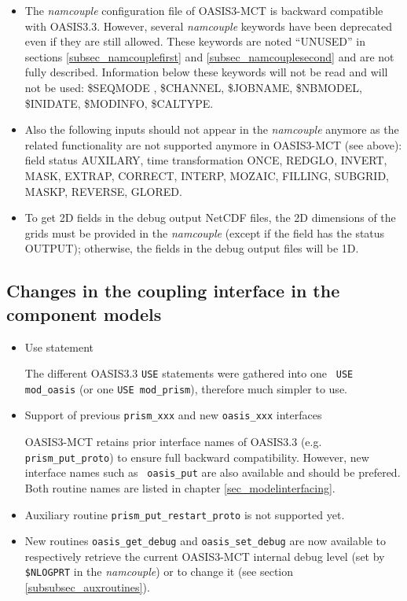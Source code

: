 \begin{itemize}

\item The {\it namcouple} configuration file of OASIS3-MCT is backward
compatible with OASIS3.3. However, several {\it namcouple} keywords
have been deprecated even if they are still 
allowed.  These keywords are noted ``UNUSED'' in sections
\ref{subsec_namcouplefirst} and \ref{subsec_namcouplesecond} and are
not fully described. Information below these keywords will not be read
and will not be used: \$SEQMODE , \$CHANNEL, \$JOBNAME, \$NBMODEL, \$INIDATE,
\$MODINFO, \$CALTYPE.

\item Also the following inputs should not appear in the {\it namcouple}
anymore as the related functionality are not supported anymore in
OASIS3-MCT (see above): field status AUXILARY, time transformation
ONCE, REDGLO, INVERT, MASK, EXTRAP, CORRECT, INTERP, MOZAIC, FILLING,
SUBGRID, MASKP, REVERSE, GLORED. 

\item To get 2D fields in the debug output NetCDF files, the 2D dimensions of the
  grids must be provided in the {\it namcouple} (except if the field
  has the status OUTPUT); otherwise, the fields in the debug output files will be 1D.

\end{itemize}

\subsection{Changes in the coupling interface in the component models}
\label{sec_changes_API}

\begin{itemize}

\item Use statement

The different OASIS3.3 {\tt USE} statements were gathered into one {\tt
  USE mod\_oasis} (or one {\tt USE mod\_prism}), therefore much
  simpler to use.

\item Support of previous {\tt prism\_xxx} and new {\tt oasis\_xxx}
  interfaces

OASIS3-MCT retains prior interface names of OASIS3.3
  (e.g. {\tt prism\_put\_proto}) to ensure full backward
  compatibility. However, new interface names such as {\tt
    oasis\_put} are also available and should be prefered. Both
  routine names are listed in chapter \ref{sec_modelinterfacing}.

\item Auxiliary routine {\tt  prism\_put\_restart\_proto} is not
  supported yet.

\item  New routines {\tt oasis\_get\_debug} and {\tt oasis\_set\_debug}
  are now available to respectively retrieve the current OASIS3-MCT
  internal debug level (set by {\tt \$NLOGPRT} in the {\it namcouple}) or to change it (see section
  \ref{subsubsec_auxroutines}).

\end{itemize}

